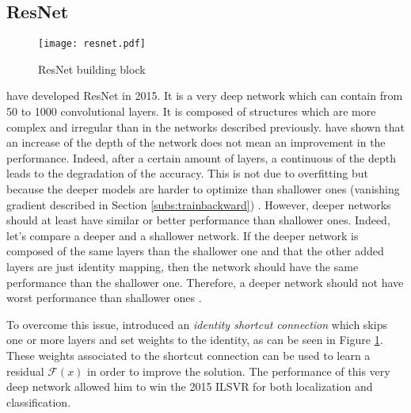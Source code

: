 \subsection{ResNet}
%
\begin{figure}
    \centering
    \texttt{[image: resnet.pdf]}
    \caption{ResNet building block \cite{he_deep_2015}}
    \label{fig:resnet}
\end{figure}
%
\textcite{he_deep_2015} have developed ResNet in 2015. It is a very deep network which can contain from 50 to 1000 convolutional layers. It is composed of structures which are more complex and irregular than in the networks described previously. \textcite{he_deep_2015} have shown that an increase of the depth of the network does not mean an improvement in the performance. Indeed, after a certain amount of layers, a continuous of the depth leads to the degradation of the accuracy. This is not due to overfitting but because the deeper models are harder to optimize than shallower ones (vanishing gradient described in Section \ref{subs:trainbackward}) \cite{matteucci_artificial_2019}. However, deeper networks should at least have similar or better performance than shallower ones. Indeed, let’s compare a deeper and a shallower network. If the deeper network is composed of the same layers than the shallower one and that the other added layers are just identity mapping, then the network should have the same performance than the shallower one. Therefore, a deeper network should not have worst performance than shallower ones \cite{matteucci_artificial_2019}.

To overcome this issue, \textcite{he_deep_2015} introduced an \textit{identity shortcut connection} which skips one or more layers and set weights to the identity, as can be seen in Figure \ref{fig:resnet}. These weights associated to the shortcut connection can be used to learn a residual $\mathcal{F}(x)$ in order to improve the solution. The performance of this very deep network allowed him to win the 2015 ILSVR for both localization and classification.
%
